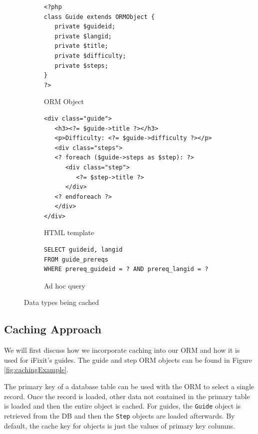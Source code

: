 \documentclass[12pt]{ucthesis}
\begin{document}
\begin{figure}[hbtp]
\begin{subfigure}[b]{1.0\textwidth}
\begin{ssp}
\begin{verbatim}
<?php
class Guide extends ORMObject {
   private $guideid;
   private $langid;
   private $title;
   private $difficulty;
   private $steps;
}
?>
\end{verbatim}
\end{ssp}
\caption{ORM Object}
\label{fig:ormObject}
\end{subfigure}

\begin{subfigure}[b]{1.0\textwidth}
\begin{ssp}
\begin{verbatim}
<div class="guide">
   <h3><?= $guide->title ?></h3>
   <p>Difficulty: <?= $guide->difficulty ?></p>
   <div class="steps">
   <? foreach ($guide->steps as $step): ?>
      <div class="step">
         <?= $step->title ?>
      </div>
   <? endforeach ?>
   </div>
</div>
\end{verbatim}
\end{ssp}
\caption{HTML template}
\label{fig:htmlTemplate}
\end{subfigure}

\begin{subfigure}[b]{1.0\textwidth}
\begin{ssp}
\begin{verbatim}
SELECT guideid, langid
FROM guide_prereqs
WHERE prereq_guideid = ? AND prereq_langid = ?
\end{verbatim}
\end{ssp}
\caption{Ad hoc query}
\label{fig:adHocQuery}
\end{subfigure}

\caption{Data types being cached}
\label{fig:dataBeingCached}
\end{figure}

\subsection{Caching Approach}
We will first discuss how we incorporate caching into our ORM and how it is used for \textsf{iFixit}'s guides.
The guide and step ORM objects can be found in Figure \ref{fig:cachingExample}.

The primary key of a database table can be used with the ORM to select a single record.
Once the record is loaded, other data not contained in the primary table is loaded and then the entire object is cached.
For guides, the {\tt Guide} object is retrieved from the DB and then the {\tt Step} objects are loaded afterwards.
By default, the cache key for objects is just the values of primary key columns.
\end{document}
